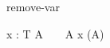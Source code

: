 \begin{circuslaw}{remove-var}
\begin{circusaction*}
  \circvar x : T \circspot A ~ \equiv ~ A \; \provided \; x \notin \FV(A)
\end{circusaction*}
\end{circuslaw}

